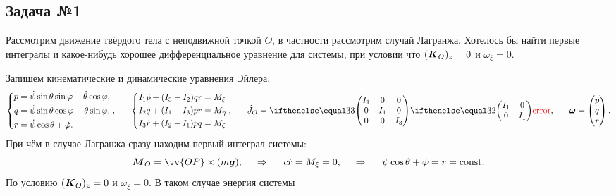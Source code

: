 \subsection*{Задача №1}

Рассмотрим движение твёрдого тела с неподвижной точкой $O$, в частности рассмотрим случай Лагранжа. Хотелось бы найти первые интегралы и какое-нибудь хорошее дифференциальное уравнение для системы, при условии что $(\mbox{\boldmath $K$}_O)_z = 0$ и $\omega_\xi = 0$.

Запишем кинематические и динамические уравнения Эйлера: 
\begin{equation*}
    \left\{\begin{aligned}
        p &= \dot{\psi} \sin \theta \sin \varphi + \dot{\theta} \cos \varphi,\\
        q &= \dot{\psi} \sin \theta \cos \varphi - \dot{\theta} \sin \varphi,\\
        r &= \dot{\psi} \cos \theta + \dot{\varphi}.
    \end{aligned}\right.,
    \hspace{0.6cm} 
    \left\{\begin{aligned}
        I_1 \dot{p} + (I_3-I_2) q r &= M_{\xi} \\
        I_2 \dot{q} + (I_1-I_3) p r &= M_{\eta} \\
        I_3 \dot{r} + (I_2-I_1) p q &= M_{\zeta} \\
    \end{aligned}\right.,   
    \hspace{0.6cm} 
    \hat{J}_O = \dmat{3}{I_1}{I_1}{I_3}, \hspace{0.6cm} 
    \vc{\omega} = \begin{pmatrix}
        p \\ q \\ r
    \end{pmatrix}.
\end{equation*}
При чём в случае Лагранжа сразу находим первый интеграл системы:
\begin{equation}
    \vc{M}_O = \vv{OP} \times (m \vc{g}), 
    \hspace{0.5cm} \Rightarrow \hspace{0.5cm} 
    c \dot{r} = M_{\xi} = 0,
    \hspace{0.5cm} \Rightarrow \hspace{0.5cm} 
    \dot{\psi} \cos \theta + \dot{\varphi} = r =\const.
\end{equation}
По условию $(\mbox{\boldmath $K$}_O)_z = 0$ и $\omega_\xi = 0$. В таком случае энергия системы 
